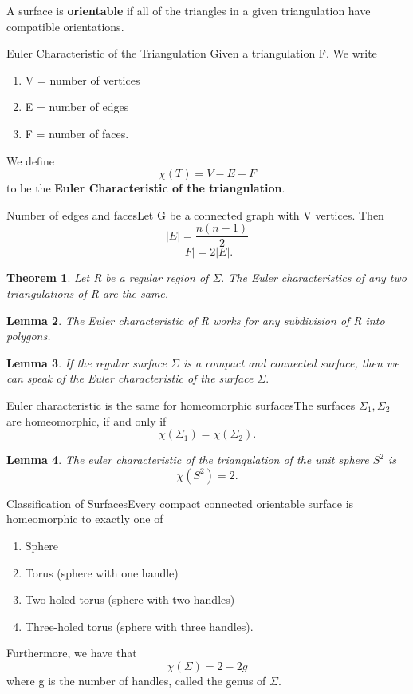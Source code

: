 \documentclass[twoside]{article}
\newcounter{lecnum}
\newtheorem{theorem}{Theorem}[lecnum]
\newtheorem{lemma}[theorem]{Lemma}
\begin{document}
A surface is \textbf{orientable} if all of the triangles in a given triangulation have compatible orientations.

\begin{definition_exam}{Euler Characteristic of the Triangulation}{} Given a triangulation F. We write 
\begin{enumerate}
\item V = number of vertices 
\item E = number of edges 
\item F = number of faces.
\end{enumerate}

We define 
$$
\chi(T) = V - E + F
$$
to be the \textbf{Euler Characteristic of the triangulation}.
\end{definition_exam}

\begin{proposition_exam}{Number of edges and faces}{}Let G be a connected graph with V vertices. Then
$$
|E| = \frac{n(n-1)}{2}
$$
$$
|F| = 2|E|.
$$
\end{proposition_exam}

\begin{theorem}Let R be a regular region of $\Sigma.$ The Euler characteristics of any two triangulations of R are the same.
\end{theorem}

\begin{lemma}The Euler characteristic of R works for any subdivision of R into polygons.
\end{lemma}

\begin{lemma}If the regular surface $\Sigma$ is a compact and connected surface, then we can speak of the Euler characteristic of the surface $\Sigma.$
\end{lemma}

\begin{theorem_exam}{Euler characteristic is the same for homeomorphic surfaces}{}The surfaces $\Sigma_1, \Sigma_2$ are homeomorphic, if and only if  
$$
\chi(\Sigma_1) = \chi(\Sigma_2).
$$
\end{theorem_exam}

\begin{lemma}The euler characteristic of the triangulation of the unit sphere $S^2$ is 
$$
\chi(S^2) = 2.
$$
\end{lemma}

\begin{theorem_exam}{Classification of Surfaces}{}Every compact connected orientable surface is homeomorphic to exactly one of 
\begin{enumerate}
\item Sphere 
\item Torus (sphere with one handle)
\item Two-holed torus (sphere with two handles)
\item Three-holed torus (sphere with three handles).
\end{enumerate}
Furthermore, we have that 
$$
\chi(\Sigma) = 2 - 2g
$$
where g is the number of handles, called the genus of $\Sigma.$
\end{theorem_exam}
\end{document}
